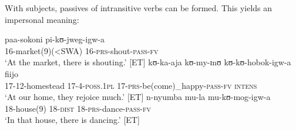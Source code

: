 With  subjects, passives of intransitive verbs can be formed. This yields an impersonal meaning:
\begin{exe}
\ex \gll paa-sokoni pi-kʊ-jweg-igw-a\\
16-market(9)(<SWA) 16-\textsc{prs}-shout-\textsc{pass}-\textsc{fv}\\
\glt `At the market, there is shouting.' [ET]
\ex \gll kʊ-ka-aja kʊ-my-ɪnʊ kʊ-kʊ-hobok-igw-a fiijo\\
17-12-homestead 17-4-\textsc{poss.1pl} 17-\textsc{prs}-be(come)\_happy-\textsc{pass}-\textsc{fv} \textsc{intens}\\
\glt `At our home, they rejoice much.' [ET]
\ex \gll n-nyumba mu-la mu-kʊ-mog-igw-a\\
18-house(9) 18-\textsc{dist} 18-\textsc{prs}-dance-\textsc{pass}-\textsc{fv}\\
\glt `In that house, there is dancing.' [ET]
\end{exe}

